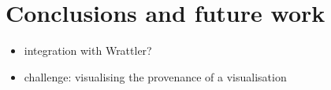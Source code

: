 \section{Conclusions and future work}

\begin{itemize}
  \item integration with Wrattler?
  \item challenge: visualising the provenance of a visualisation
\end{itemize}

\begin{comment}
There are a number of challenges associated with making our approach practical
and appealing to actual data scientists. A central usability challenge is
visualising these complex relationships between the various parts of a
visualisation and the relevant data and/or visualisation code. This is
essentially a higher-order visualisation problem: visualising information about
the provenance of visualisations. Ideas from temporal data visualisation
\cite{bach16}, data-driven storytelling \cite{bach18}, and ``literate''
visualisation \cite{wood19} may inform our efforts here.
\end{comment}
